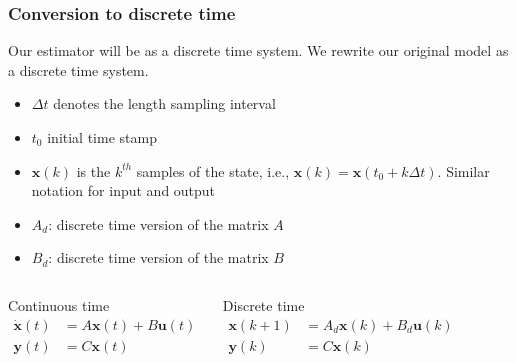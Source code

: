 \begin{frame}
\begin{columns}
    \end{columns}
\end{frame}

\begin{frame} 
    \frametitle{Conversion to discrete time}
    Our estimator will be as a discrete time system. We rewrite our original model as a discrete time system. 
    
    \begin{itemize}
        \item $\Delta t$ denotes the length sampling interval
        \item $t_0$ initial time stamp
        \item ${\bm{x}}(k)$ is the $k^{th}$ samples of the state, i.e., $\bm{x}(k)=\bm{x}(t_0+k\Delta t)$. Similar notation for input and output
        \item $A_d$: discrete time version of the matrix $A$
        \item $B_d$: discrete time version of the matrix $B$
    \end{itemize}
     
    \begin{columns}[onlytextwidth]
        \begin{block}{Continuous time}
            \vspace*{-1em}
            \begin{align*}
            \dot{\bm{x}}(t) &= A \bm{x}(t) + B \bm{u}(t)\\
            \bm{y}(t) &= C \bm{x}(t) 
            \end{align*}
        \end{block}    
        \begin{block}{Discrete time}
            \vspace*{-1em}
            \begin{align*}
            \bm{x}(k+1) &= A_d \bm{x}(k) + B_d \bm{u}(k)\\
            \bm{y}(k) &= C \bm{x}(k) 
            \end{align*}
        \end{block}
    \end{columns}
\end{frame}

